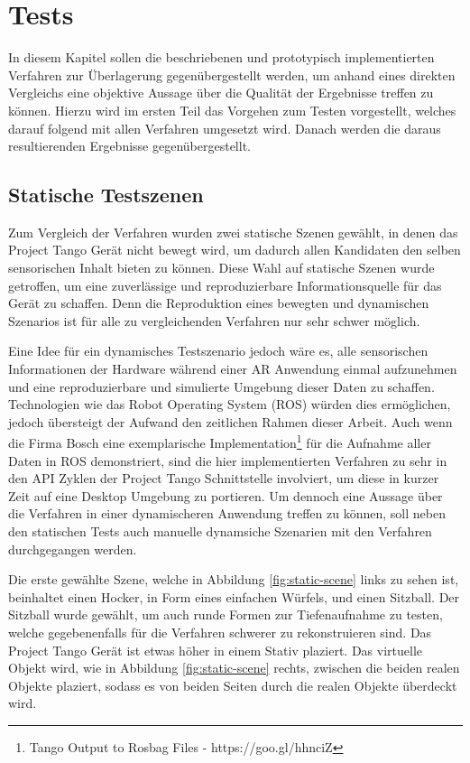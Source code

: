 \chapter{Tests} \label{sec:evaluation}

In diesem Kapitel sollen die beschriebenen und prototypisch implementierten Verfahren zur Überlagerung gegenübergestellt werden, um anhand eines direkten Vergleichs eine objektive Aussage über die Qualität der Ergebnisse treffen zu können. Hierzu wird im ersten Teil das Vorgehen zum Testen vorgestellt, welches darauf folgend mit allen Verfahren umgesetzt wird. Danach werden die daraus resultierenden Ergebnisse gegenübergestellt.

\section{Statische Testszenen}

Zum Vergleich der Verfahren wurden zwei statische Szenen gewählt, in denen das Project Tango Gerät nicht bewegt wird, um dadurch allen Kandidaten den selben sensorischen Inhalt bieten zu können. Diese Wahl auf statische Szenen wurde getroffen, um eine zuverlässige und reproduzierbare Informationsquelle für das Gerät zu schaffen. Denn die Reproduktion eines bewegten und dynamischen Szenarios ist für alle zu vergleichenden Verfahren nur sehr schwer möglich. 

Eine Idee für ein dynamisches Testszenario jedoch wäre es, alle sensorischen Informationen der Hardware während einer AR Anwendung einmal aufzunehmen und eine reproduzierbare und simulierte Umgebung dieser Daten zu schaffen. Technologien wie das Robot Operating System (ROS) würden dies ermöglichen, jedoch übersteigt der Aufwand den zeitlichen Rahmen dieser Arbeit. Auch wenn die Firma Bosch eine exemplarische Implementation\footnote{Tango Output to Rosbag Files - https://goo.gl/hhnciZ} für die Aufnahme aller Daten in ROS demonstriert, sind die hier implementierten Verfahren zu sehr in den API Zyklen der Project Tango Schnittstelle involviert, um diese in kurzer Zeit auf eine Desktop Umgebung zu portieren. Um dennoch eine Aussage über die Verfahren in einer dynamischeren Anwendung treffen zu können, soll neben den statischen Tests auch manuelle dynamsiche Szenarien mit den Verfahren durchgegangen werden.

Die erste gewählte Szene, welche in Abbildung \ref{fig:static-scene} links zu sehen ist, beinhaltet einen Hocker, in Form eines einfachen  Würfels, und einen Sitzball. Der Sitzball wurde gewählt, um auch runde Formen zur Tiefenaufnahme zu testen, welche gegebenenfalls für die Verfahren schwerer zu rekonstruieren sind. Das Project Tango Gerät ist etwas höher in einem Stativ plaziert. Das virtuelle Objekt wird, wie in Abbildung \ref{fig:static-scene} rechts, zwischen die beiden realen Objekte plaziert, sodass es von beiden Seiten durch die realen Objekte überdeckt wird. 

